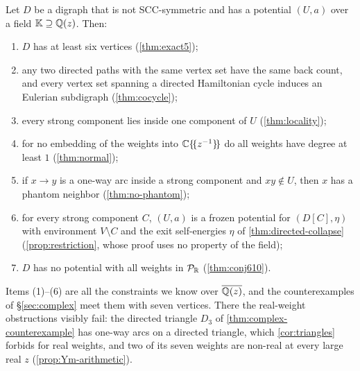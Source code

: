 \begin{proposition}\label{prop:shape}
Let $D$ be a digraph that is not SCC-symmetric and has a potential $(U,a)$ over a field $\mathbb K\supseteq\mathbb{Q}(z)$. Then:
\begin{enumerate}[label=\textup{(\arabic*)}]
\item $D$ has at least six vertices \textup{(\cref{thm:exact5})};
\item any two directed paths with the same vertex set have the same back count, and every vertex set spanning a directed Hamiltonian cycle induces an Eulerian subdigraph \textup{(\cref{thm:cocycle})};
\item every strong component lies inside one component of $U$ \textup{(\cref{thm:locality})};
\item for no embedding of the weights into $\mathbb{C}\{\!\{z^{-1}\}\!\}$ do all weights have degree at least $1$ \textup{(\cref{thm:normal})};
\item if $x\to y$ is a one-way arc inside a strong component and $xy\notin U$, then $x$ has a phantom neighbor \textup{(\cref{thm:no-phantom})};
\item for every strong component $C$, $(U,a)$ is a frozen potential for $(D[C],\eta)$ with environment $V\setminus C$ and the exit self-energies $\eta$ of \cref{thm:directed-collapse} \textup{(\cref{prop:restriction}, whose proof uses no property of the field)};
\item $D$ has no potential with all weights in $\mathcal{P}_{\mathbb{R}}$ \textup{(\cref{thm:conj610})}.
\end{enumerate}
\end{proposition}

Items (1)--(6) are all the constraints we know over $\overline{\mathbb{Q}(z)}$, and the counterexamples of \S\ref{sec:complex} meet them with seven vertices. There the real-weight obstructions visibly fail: the directed triangle $D_3$ of \cref{thm:complex-counterexample} has one-way arcs on a directed triangle, which \cref{cor:triangles} forbids for real weights, and two of its seven weights are non-real at every large real $z$ (\cref{prop:Ym-arithmetic}).
